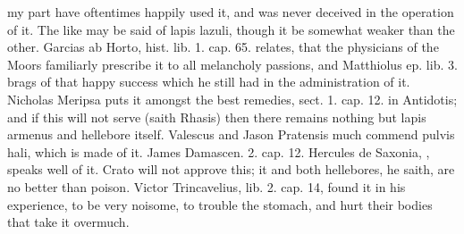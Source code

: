 {my part have oftentimes happily used it, and was never deceived in the
operation of it. The like may be said of lapis lazuli, though it be
somewhat weaker than the other. Garcias ab Horto, hist. lib. 1. cap.
65. relates, that the physicians of the Moors familiarly
prescribe it to all melancholy passions, and Matthiolus ep. lib. 3.
brags of that happy success which he still had in the
administration of it. Nicholas Meripsa puts it amongst the best
remedies, sect. 1. cap. 12. in Antidotis; and if this will not
serve (saith Rhasis) then there remains nothing but lapis armenus and
hellebore itself. Valescus and Jason Pratensis much commend pulvis
hali, which is made of it. James Damascen. 2. cap. 12. Hercules de
Saxonia, \etc{}, speaks well of it. Crato will not approve this; it and
both hellebores, he saith, are no better than poison. Victor
Trincavelius, lib. 2. cap. 14, found it in his experience, to be
very noisome, to trouble the stomach, and hurt their bodies that take
it overmuch.
\clearpage{}
}
